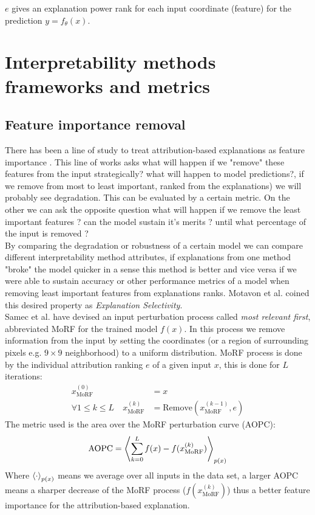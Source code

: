\documentclass[12pt]{report}
\begin{document}
$e$ gives an explanation power rank for each input coordinate (feature) for the prediction $y=f_{\theta}(x)$.


\section{Interpretability methods frameworks and metrics}

\subsection{Feature importance removal}

There has been a line of study to treat attribution-based explanations as feature importance \cite{https://doi.org/10.48550/arxiv.1509.06321} \cite{https://doi.org/10.48550/arxiv.1806.10758} \cite{DBLP:journals/corr/MontavonSM17}.  This line of works asks what will happen if we "remove" these features from the input strategically?  what will happen to model predictions?, if we remove from most to least important, ranked from the explanations) we will probably see degradation. This can be evaluated by a certain metric. On the other we can ask the opposite question what will happen if we remove the least important features ? can the model sustain it's merits ? until what percentage of the input is removed ? \\

By comparing the degradation or robustness of a certain model we can compare different interpretability method attributes, if explanations from one method "broke" the model quicker in a sense this method is better and vice versa if we were able to sustain accuracy or other performance metrics of a model when removing least important features from explanations ranks. Motavon et al. \cite{DBLP:journals/corr/MontavonSM17} coined this desired property as \textit{Explanation Selectivity}.\\

Samec et al. \cite{https://doi.org/10.48550/arxiv.1509.06321} have devised an input perturbation process called \textit{most relevant first}, abbreviated MoRF for the trained model $f(x)$. In this process we remove information from the input by setting the coordinates (or a region of surrounding pixels e.g. $9 \times 9$ neighborhood) to a uniform distribution. MoRF process is done by the individual attribution ranking $e$ of a given input $x$, this is done for $L$ iterations:
\begin{align*}
	x_{\text{MoRF}}^{(0)} & = x  \\ 
	\forall 1 \le k \le L \quad x_{\text{MoRF}}^{(k)} &= \text{Remove} (x_{\text{MoRF}}^{(k-1)}, e)	
\end{align*}
The metric used is the area over the MoRF perturbation curve (AOPC):
\begin{align*}
	\text{AOPC} = \Braket{	\sum_{k=0}^{L}f(x) -f(x_{\text{MoRF}}^{(k)})}_{p(x)}
\end{align*}
Where $\Braket{\cdot}_{p(x)}$ means we average over all inputs in the data set, a larger AOPC means a sharper decrease of the MoRF process ($f(x_{\text{MoRF}}^{(k)})$) thus a better feature importance for the attribution-based explanation. \\
\end{document}
